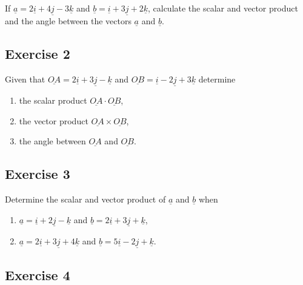 \documentclass[
  english,
  11pt,
  oneside]{book}
\providecommand{\tightlist}{%
  \setlength{\itemsep}{0pt}\setlength{\parskip}{0pt}}
\newcommand{\slide}{}
\theoremstyle{definition}
\theoremstyle{definition}
\theoremstyle{definition}
\theoremstyle{definition}
\theoremstyle{remark}
\begin{document}
If \(\underline{a} = 2\underline{i} + 4\underline{j} - 3\underline{k}\) and \(\underline{b} = \underline{i} + 3\underline{j} + 2\underline{k}\), calculate the scalar and vector product and the angle between the vectors \(\underline{a}\) and \(\underline{b}\).

\slide

\subsection*{Exercise 2}\label{exercise-2-14}

Given that \(\underline{OA} = 2\underline{i} + 3\underline{j} - \underline{k}\) and \(\underline{OB} = \underline{i} - 2\underline{j} + 3\underline{k}\) determine

\begin{enumerate}
\def\labelenumi{\roman{enumi}.}
\tightlist
\item
  the scalar product \(\underline{OA}\cdot\underline{OB}\),
\item
  the vector product \(\underline{OA}\times\underline{OB}\),
\item
  the angle between \(\underline{OA}\) and \(\underline{OB}\).
\end{enumerate}

\slide

\subsection*{Exercise 3}\label{exercise-3-12}

Determine the scalar and vector product of \(\underline{a}\) and \(\underline{b}\) when

\begin{enumerate}
\def\labelenumi{\roman{enumi}.}
\tightlist
\item
  \(\underline{a} = \underline{i} + 2\underline{j} - \underline{k}\) and \(\underline{b} = 2\underline{i} + 3\underline{j} + \underline{k}\),
\item
  \(\underline{a} = 2\underline{i} + 3\underline{j} + 4\underline{k}\) and \(\underline{b} = 5\underline{i} - 2\underline{j} + \underline{k}\).
\end{enumerate}

\slide

\subsection*{Exercise 4}\label{exercise-4-10}
\end{document}
